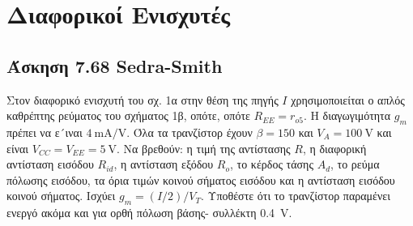 \documentclass[11pt,a4paper,titlepage,fleqn]{article}
\begin{document}
\section{Διαφορικοί Ενισχυτές}

\subsection{Άσκηση 7.68 Sedra-Smith}
\label{sec:D.sedra_smith7.68}

	Στον διαφορικό ενισχυτή του σχ. 1α στην θέση της πηγής $I$ χρησιμοποιείται ο απλός καθρέπτης ρεύματος του σχήματος 1β, οπότε, οπότε $R_{EE} = r_{o5}$. Η διαγωγιμότητα $g_m$ πρέπει να ε´ιναι $\SI[per-mode=symbol]{4}{\milli\ampere\per\volt}$. Όλα τα τρανζίστορ έχουν $\beta = 150 $ και $V_A=\SI{100}{\volt}$ και είναι $V_{CC} = V_{EE} = \SI{5}{\volt}$. Να βρεθούν: η τιμή της αντίστασης $R$, η διαφορική αντίσταση εισόδου $R_{id}$, η αντίσταση εξόδου $R_o$, το κέρδος τάσης $A_d$, το ρεύμα πόλωσης εισόδου, τα όρια τιμών κοινού σήματος εισόδου και η αντίσταση εισόδου κοινού σήματος. Ισχύει $g_m = (I / 2) / V_T$. Υποθέστε ότι το τρανζίστορ παραμένει ενεργό ακόμα και για ορθή πόλωση βάσης- συλλέκτη \SI{0,4}{\volt}.
	
	\begin{center}

	\end{center}

\end{document}
